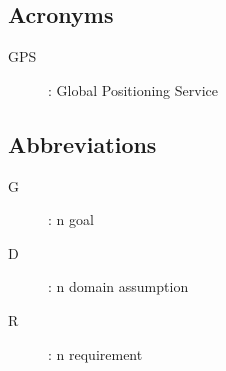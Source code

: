 \documentclass[../../rasd.tex]{subfiles}
\begin{document}
		\subsection{Acronyms}
		\begin{description}
		\item[GPS]: Global Positioning Service
		\end{description}
		\subsection{Abbreviations}
		\begin{description}
			\item[G]: n goal
			\item[D]: n domain assumption
			\item[R]: n requirement
			
		\end{description}
		
\end{document}
